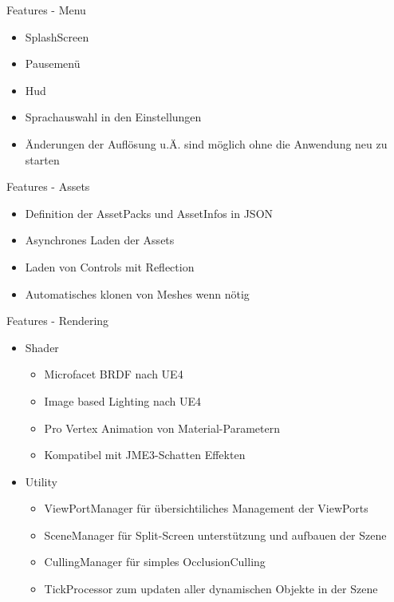 \documentclass[10pt]{beamer}
\begin{document}
\begin{frame}{Features - Menu}
\begin{itemize}
    \item SplashScreen
    \item Pausemenü
    \item Hud
    \item Sprachauswahl in den Einstellungen
    \item Änderungen der Auflösung u.Ä. sind möglich ohne die Anwendung neu zu starten
\end{itemize}
\end{frame}

\begin{frame}{Features - Assets}
    \begin{itemize}
        \item Definition der AssetPacks und AssetInfos in JSON
        \item Asynchrones Laden der Assets
        \item Laden von Controls mit Reflection
        \item Automatisches klonen von Meshes wenn nötig
    \end{itemize}
\end{frame}

\begin{frame}{Features - Rendering}
\begin{itemize}
    \item Shader
    \begin{itemize}
        \item Microfacet BRDF nach UE4
        \item Image based Lighting nach UE4
        \item Pro Vertex Animation von Material-Parametern
        \item Kompatibel mit JME3-Schatten Effekten
    \end{itemize}
    \item Utility
    \begin{itemize}
        \item ViewPortManager für übersichtiliches Management der ViewPorts
        \item SceneManager für Split-Screen unterstützung und aufbauen der Szene
        \item CullingManager für simples OcclusionCulling
        \item TickProcessor zum updaten aller dynamischen Objekte in der Szene
    \end{itemize}
\end{itemize}
\end{frame}
\end{document}

